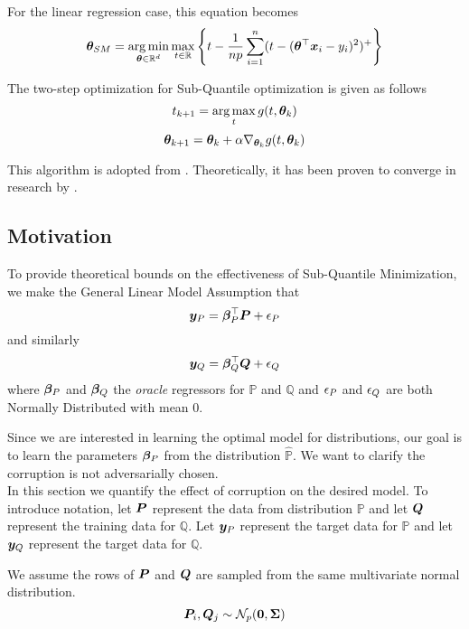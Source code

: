 \documentclass{article} %
\begin{document}
	For the linear regression case, this equation becomes 
	\begin{equation}
		\label{eqn:theta_sm}
		{\bm{\theta}}_{SM} = \operatorname*{arg\,min}_{{\bm{\theta}} \in \mathbb{R}^d} \max_{t \in \mathbb{R}} \left\{t - \frac{1}{np}\sum_{i=1}^n(t-({\bm{\theta}}^\top{\bm{x}}_i - y_i)^2)^+\right\}
	\end{equation}
		
	The two-step optimization for Sub-Quantile optimization is given as follows \vspace{1em}
	\begin{equation}
		\label{eqn:t-update}
		t_{k+1} = \operatorname*{arg\,max}_t g(t,{\bm{\theta}}_k) 
	\end{equation}
	\begin{equation}
		\label{eqn:theta-update}
		{\bm{\theta}}_{k+1} = {\bm{\theta}}_k + \alpha \nabla_{{\bm{\theta}}_k} g(t,{\bm{\theta}}_k)
	\end{equation}
		
	This algorithm is adopted from \cite{Razaviyayn}. Theoretically, it has been proven to converge in research by \cite{Jin_2019}.
	
		
	\subsection{Motivation}
	\begin{assumption}\label{asm:normal-corruption}
		To provide theoretical bounds on the effectiveness of Sub-Quantile Minimization, we make the General Linear Model Assumption that
		\begin{equation}\vspace{1em}
			\vy_P = \vbeta_P^\top\mP  + \eps_P
		\end{equation}
		and similarly 
		\begin{equation}
			{\bm{y}}_Q = {\bm{\beta}}_Q^\top {\bm{Q}} + {\epsilon}_Q
		\end{equation}
		where ${\bm{\beta}}_P$ and ${\bm{\beta}}_Q$ the \textit{oracle} regressors for $\mathbb{P}$ and $\mathbb{Q}$ and ${\epsilon}_P$ and ${\epsilon}_Q$ are both Normally Distributed with mean $0$.  
	\end{assumption}
	Since we are interested in learning the optimal model for distributions, our goal is to learn the parameters ${\bm{\beta}}_P$ from the distribution $\hat{\mathbb{P}}$. We want to clarify the corruption is not adversarially chosen. \\
	In this section we quantify the effect of corruption on the desired model. To introduce notation, let ${\bm{P}}$ represent the data from distribution $\mathbb{P}$ and let ${\bm{Q}}$ represent the training data for $\mathbb{Q}$. Let ${\bm{y}}_P$ represent the target data for $\mathbb{P}$ and let ${\bm{y}}_Q$ represent the target data for $\mathbb{Q}$.\\
	\begin{assumption}\label{asm:p-q-sample}
		We assume the rows of ${\bm{P}}$ and ${\bm{Q}}$ are sampled from the same multivariate normal distribution. \vspace{1em}
		\begin{equation}
			{\bm{P}}_i,{\bm{Q}}_j \sim \mathcal{N}_p(\mathbf{0},{\bm{\Sigma}})
		\end{equation}
	\end{assumption}
	
\end{document}
